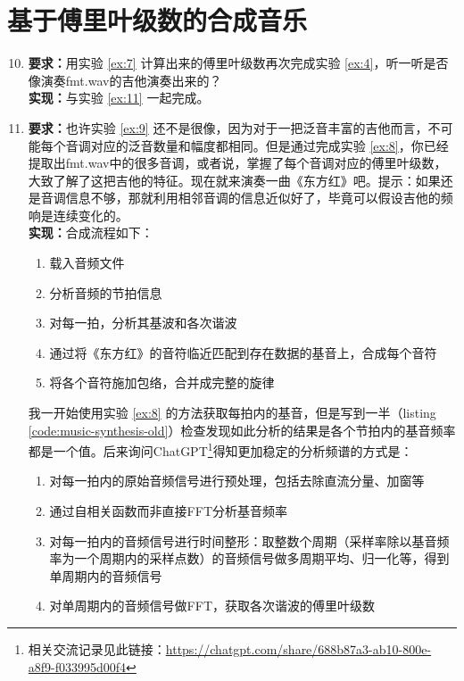 \documentclass[utf8]{article}
\begin{document}
\section{基于傅里叶级数的合成音乐}
\begin{enumerate}
    \setcounter{enumi}{9}
    \item \label{ex:10}\textbf{要求：}用实验 \ref{ex:7} 计算出来的傅里叶级数再次完成实验 \ref{ex:4}，听一听是否像演奏fmt.wav的吉他演奏出来的？ \\
        \textbf{实现：}与实验 \ref{ex:11} 一起完成。
    \item \label{ex:11}\textbf{要求：}也许实验 \ref{ex:9} 还不是很像，因为对于一把泛音丰富的吉他而言，不可能每个音调对应的泛音数量和幅度都相同。但是通过完成实验 \ref{ex:8}，你已经提取出fmt.wav中的很多音调，或者说，掌握了每个音调对应的傅里叶级数，大致了解了这把吉他的特征。现在就来演奏一曲《东方红》吧。提示：如果还是音调信息不够，那就利用相邻音调的信息近似好了，毕竟可以假设吉他的频响是连续变化的。 \\
        \textbf{实现：}合成流程如下：
        \begin{enumerate}
            \item 载入音频文件
            \item 分析音频的节拍信息
            \item 对每一拍，分析其基波和各次谐波
            \item 通过将《东方红》的音符临近匹配到存在数据的基音上，合成每个音符
            \item 将各个音符施加包络，合并成完整的旋律
        \end{enumerate}
        我一开始使用实验 \ref{ex:8} 的方法获取每拍内的基音，但是写到一半（listing \ref{code:music-synthesis-old}）检查发现如此分析的结果是各个节拍内的基音频率都是一个值。后来询问ChatGPT\footnote{相关交流记录见此链接：\href{https://chatgpt.com/share/688b87a3-ab10-800e-a8f9-f033995d00f4}{https://chatgpt.com/share/688b87a3-ab10-800e-a8f9-f033995d00f4}}得知更加稳定的分析频谱的方式是：
        \begin{enumerate}
            \item 对每一拍内的原始音频信号进行预处理，包括去除直流分量、加窗等
            \item 通过自相关函数而非直接FFT分析基音频率
            \item 对每一拍内的音频信号进行时间整形：取整数个周期（采样率除以基音频率为一个周期内的采样点数）的音频信号做多周期平均、归一化等，得到单周期内的音频信号
            \item 对单周期内的音频信号做FFT，获取各次谐波的傅里叶级数

\end{enumerate}
\end{enumerate}
\end{document}
